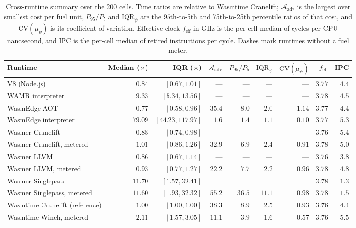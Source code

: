 \begin{table}[t]
\caption{Cross-runtime summary over the 200 cells. Time ratios are relative to Wasmtime Cranelift; $\mathcal{A}_{\mathrm{adv}}$ is the largest over smallest cost per fuel unit, $P_{95}/P_5$ and $\mathrm{IQR}_\psi$ are the 95th-to-5th and 75th-to-25th percentile ratios of that cost, and $\mathrm{CV}(\mu_\psi)$ is its coefficient of variation. Effective clock $f_{\mathrm{eff}}$ in GHz is the per-cell median of cycles per CPU nanosecond, and IPC is the per-cell median of retired instructions per cycle. Dashes mark runtimes without a fuel meter.}\label{tab:runtime_summary}
\footnotesize
\setlength{\tabcolsep}{3pt}%
\begin{adjustbox}{max width=\textwidth}%
\begin{tabular}{lrrrrrrrr}
\toprule
Runtime & Median ($\times$) & IQR ($\times$) & $\mathcal{A}_{\mathrm{adv}}$ & $P_{95}/P_5$ & $\mathrm{IQR}_\psi$ & $\mathrm{CV}(\mu_\psi)$ & $f_{\mathrm{eff}}$ & IPC \\
\midrule
V8 (Node.js) & $0.84$ & $[0.67, 1.01]$ & --- & --- & --- & --- & $3.77$ & $4.4$ \\
WAMR interpreter & $9.33$ & $[5.34, 13.56]$ & --- & --- & --- & --- & $3.78$ & $4.5$ \\
WasmEdge AOT & $0.77$ & $[0.58, 0.96]$ & $35.4$ & $8.0$ & $2.0$ & $1.14$ & $3.77$ & $4.4$ \\
WasmEdge interpreter & $79.09$ & $[44.23, 117.97]$ & $1.6$ & $1.4$ & $1.1$ & $0.10$ & $3.77$ & $5.3$ \\
Wasmer Cranelift & $0.88$ & $[0.74, 0.98]$ & --- & --- & --- & --- & $3.76$ & $5.4$ \\
Wasmer Cranelift, metered & $1.01$ & $[0.86, 1.26]$ & $32.9$ & $6.9$ & $2.4$ & $0.91$ & $3.78$ & $5.0$ \\
Wasmer LLVM & $0.86$ & $[0.67, 1.14]$ & --- & --- & --- & --- & $3.76$ & $3.8$ \\
Wasmer LLVM, metered & $0.93$ & $[0.77, 1.27]$ & $22.2$ & $7.7$ & $2.2$ & $0.96$ & $3.78$ & $4.8$ \\
Wasmer Singlepass & $11.70$ & $[1.57, 32.41]$ & --- & --- & --- & --- & $3.78$ & $1.3$ \\
Wasmer Singlepass, metered & $11.60$ & $[1.93, 32.32]$ & $55.2$ & $36.5$ & $11.1$ & $0.98$ & $3.78$ & $1.5$ \\
Wasmtime Cranelift (reference) & $1.00$ & $[1.00, 1.00]$ & $38.3$ & $8.9$ & $2.5$ & $0.93$ & $3.76$ & $4.4$ \\
Wasmtime Winch, metered & $2.11$ & $[1.57, 3.05]$ & $11.1$ & $3.9$ & $1.6$ & $0.57$ & $3.76$ & $5.5$ \\
\bottomrule
\end{tabular}%
\end{adjustbox}
\end{table}
